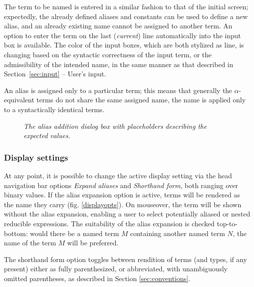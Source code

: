 \documentclass[table, a4paper, 10pt]{article}
\begin{document}
The term to be named is entered in a similar fashion to that of the initial screen;
expectedly, the already defined aliases and constants can be used to define a new alias,
and an already existing name cannot be assigned to another term.
An option to enter the term on the last (\textit{current}) line automatically into the 
input box is available. The color of the input boxes, which are both stylized as line, is changing
based on the syntactic correctness of the input term, or the admissibility of the intended name,
in the same manner as that described in Section~\ref{sec:input} -- User's input.

An alias is assigned only to a particular term; this means that
generally the $\alpha$-equivalent terms do not share the same assigned name,
the name is applied only to a syntactically identical terms.

\begin{figure}[H]\centering
{}
\caption{\textit{The alias addition dialog box with placeholders describing the expected values.}}\label{aliaswindow}
\end{figure}

\subsubsection{Display settings}
At any point, it is possible to change the active display setting via the 
head navigation bar options \textit{Expand aliases} and \textit{Shorthand form},
both ranging over binary values. If the alias expansion option is active,
terms will be rendered as the name they carry (fig. \ref{displayopts}). On mouseover, the term will
be shown without the alias expansion, enabling a user to select potentially
aliased or nested reducible expressions. The suitability of the alias expansion is
checked top-to-bottom: would there be a named term $M$ containing another named term $N$,
the name of the term $M$ will be preferred.

The shorthand form option toggles between rendition of terms (and types, if any present)
either as fully parenthesized, or abbreviated,
with unambiguously omitted parentheses, as described in Section \ref{sec:conventions}.
\end{document}
